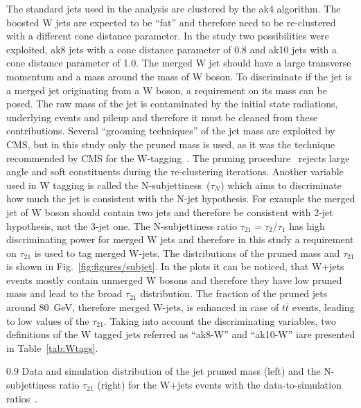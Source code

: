 The standard jets used in the analysis are clustered by the ak4 algorithm. The boosted W jets are expected to be ``fat'' and therefore need to be re-clustered with a different cone distance parameter. In the study two possibilities were exploited, ak8 jets with a cone distance parameter  of 0.8 and ak10 jets with a cone distance parameter of 1.0. The merged W jet should have a large transverse momentum and a mass around the mass of W boson. To discriminate if the jet is a merged jet originating from a W boson, a requirement on its mass can be posed. The raw mass of the jet is contaminated by the initial state radiations, underlying events and pileup and therefore it must be cleaned from these contributions. Several ``grooming techniques'' of the jet mass are exploited by CMS, but in this study only the pruned mass is used, as it was the technique recommended by CMS for the W-tagging~\cite{website:Wtagging}. The pruning procedure~\cite{Ellis:2009su} rejects large angle and soft constituents during the re-clustering iterations. Another variable used in W tagging is called the N-subjettiness~($\tau_{N}$) which aims to discriminate how much the jet is consistent with the N-jet hypothesis. For example the merged jet of W boson should contain two jets and therefore be consistent with 2-jet hypothesis, not the 3-jet one. The N-subjettiness ratio $\tau_{21} = \tau_{2}/\tau_{1}$ has high discriminating power for merged W jets and therefore in this study a requirement on $\tau_{21}$ is used to tag merged W-jets. The distributions of the pruned mass and  $\tau_{21}$ is shown in Fig.~\ref{fig:figures/subjet}. In the plots it can be noticed, that  W+jets events mostly contain unmerged W bosons and therefore they have low pruned mass and lead to the broad $\tau_{21}$ distribution. The fraction of the pruned jets around 80~GeV, therefore merged W-jets, is enhanced in case of $t\bar{t}$ events, leading to low values of the $\tau_{21}$. Taking into account the discriminating variables, two definitions of the W tagged jets referred as ``ak8-W'' and ``ak10-W'' iare presented in Table~\ref{tab:Wtags}.


                 {0.9}       %
                 {Data and simulation distribution of the jet pruned mass (left) and the N-subjettiness ratio $\tau_{21}$ (right) for the W+jets events with the data-to-simulation ratios~\cite{chatryan:2014vla}.}


